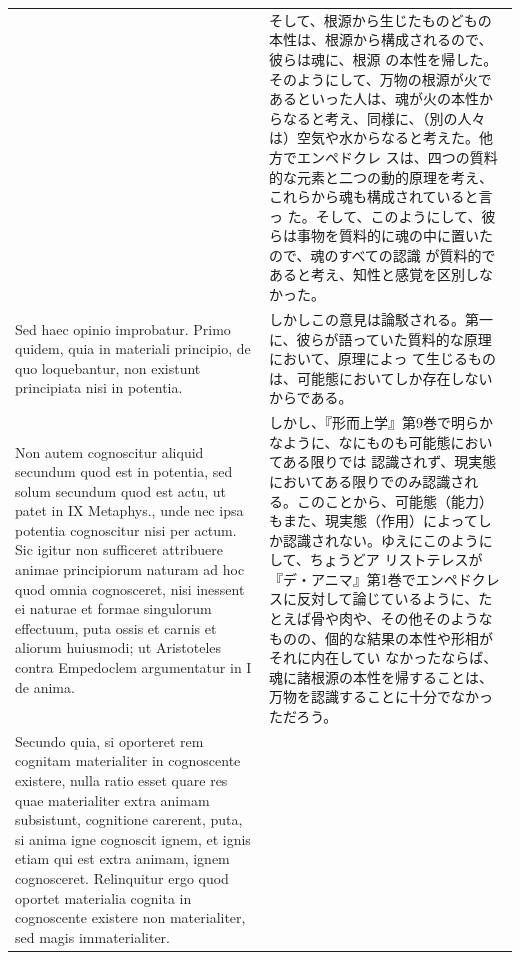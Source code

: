 \documentclass[paper=a4paper,fontsize=10pt,jafontsize=9pt,titlepage]{jlreq}
\begin{document}
\begin{longtable}{p{21em}p{21em}}
&

そして、根源から生じたものどもの本性は、根源から構成されるので、彼らは魂に、根源
の本性を帰した。そのようにして、万物の根源が火であるといった人は、魂が火の本性か
らなると考え、同様に、（別の人々は）空気や水からなると考えた。他方でエンペドクレ
スは、四つの質料的な元素と二つの動的原理を考え、これらから魂も構成されていると言っ
た。そして、このようにして、彼らは事物を質料的に魂の中に置いたので、魂のすべての認識
が質料的であると考え、知性と感覚を区別しなかった。
 

\\[1em]

Sed haec opinio improbatur. Primo quidem, quia in materiali principio, de quo
loquebantur, non existunt principiata nisi in potentia.

&

しかしこの意見は論駁される。第一に、彼らが語っていた質料的な原理において、原理によっ
て生じるものは、可能態においてしか存在しないからである。

\\[1em]

Non autem cognoscitur aliquid secundum quod est in potentia, sed solum secundum
quod est actu, ut patet in IX Metaphys., unde nec ipsa potentia cognoscitur nisi
per actum. Sic igitur non sufficeret attribuere animae principiorum naturam ad
hoc quod omnia cognosceret, nisi inessent ei naturae et formae singulorum
effectuum, puta ossis et carnis et aliorum huiusmodi; ut Aristoteles contra
Empedoclem argumentatur in I de anima.

&

しかし、『形而上学』第9巻で明らかなように、なにものも可能態においてある限りでは
認識されず、現実態においてある限りでのみ認識される。このことから、可能態（能力）
もまた、現実態（作用）によってしか認識されない。ゆえにこのようにして、ちょうどア
リストテレスが『デ・アニマ』第1巻でエンペドクレスに反対して論じているように、た
とえば骨や肉や、その他そのようなものの、個的な結果の本性や形相がそれに内在してい
なかったならば、魂に諸根源の本性を帰することは、万物を認識することに十分でなかっ
ただろう。

\\[1em]

Secundo quia, si oporteret rem cognitam materialiter in cognoscente existere,
nulla ratio esset quare res quae materialiter extra animam subsistunt,
cognitione carerent, puta, si anima igne cognoscit ignem, et ignis etiam qui est
extra animam, ignem cognosceret. Relinquitur ergo quod oportet materialia
cognita in cognoscente existere non materialiter, sed magis immaterialiter.


\end{longtable}
\end{document}
